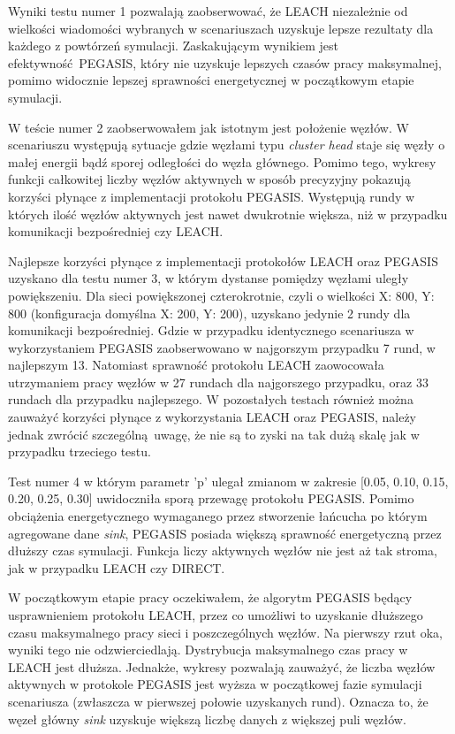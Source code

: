 \documentclass[a4paper,12pt,twoside,openany]{report}
\begin{document}
Wyniki testu numer 1 pozwalają zaobserwować, że LEACH niezależnie od wielkości wiadomości wybranych w scenariuszach uzyskuje lepsze rezultaty dla każdego z powtórzeń symulacji.
Zaskakującym wynikiem jest efektywność PEGASIS, który nie uzyskuje lepszych czasów pracy maksymalnej, pomimo widocznie lepszej sprawności energetycznej w początkowym etapie symulacji.

W teście numer 2 zaobserwowałem jak istotnym jest położenie węzłów. W scenariuszu występują sytuacje gdzie węzłami typu \textit{cluster head} staje się węzły o małej energii bądź sporej odległości do węzła głównego.
Pomimo tego, wykresy funkcji całkowitej liczby węzłów aktywnych w sposób precyzyjny pokazują korzyści płynące z implementacji protokołu PEGASIS. Występują rundy w których ilość węzłów aktywnych jest nawet dwukrotnie większa, niż w przypadku
komunikacji bezpośredniej czy LEACH.

Najlepsze korzyści płynące z implementacji protokołów LEACH oraz PEGASIS uzyskano dla testu numer 3, w którym dystanse pomiędzy węzłami uległy powiększeniu.
Dla sieci powiększonej czterokrotnie, czyli o wielkości X: 800, Y: 800 (konfiguracja domyślna X: 200, Y: 200), uzyskano jedynie 2 rundy dla komunikacji bezpośredniej.
Gdzie w przypadku identycznego scenariusza w wykorzystaniem PEGASIS zaobserwowano w najgorszym przypadku 7 rund, w najlepszym 13. Natomiast sprawność protokołu LEACH zaowocowała utrzymaniem pracy węzłów 
w 27 rundach dla najgorszego przypadku, oraz 33 rundach dla przypadku najlepszego.
W pozostałych testach również można zauważyć korzyści płynące z wykorzystania LEACH oraz PEGASIS, należy jednak zwrócić szczególną uwagę, że nie są to zyski na tak dużą skalę jak w przypadku trzeciego testu.

Test numer 4 w którym parametr 'p' ulegał zmianom w zakresie [0.05, 0.10, 0.15, 0.20, 0.25, 0.30] uwidoczniła sporą przewagę protokołu PEGASIS. Pomimo obciążenia energetycznego wymaganego przez stworzenie łańcucha
po którym agregowane dane \textit{sink}, PEGASIS posiada większą sprawność energetyczną przez dłuższy czas symulacji. Funkcja liczy aktywnych węzłów nie jest aż tak stroma, jak w przypadku LEACH czy DIRECT.

W początkowym etapie pracy oczekiwałem, że algorytm PEGASIS będący usprawnieniem protokołu LEACH, przez co umożliwi to uzyskanie dłuższego czasu maksymalnego pracy sieci i poszczególnych węzłów.
Na pierwszy rzut oka, wyniki tego nie odzwierciedlają. Dystrybucja maksymalnego czas pracy w LEACH jest dłuższa. Jednakże, wykresy pozwalają zauważyć, że liczba węzłów aktywnych
w protokole PEGASIS jest wyższa w początkowej fazie symulacji scenariusza (zwłaszcza w pierwszej połowie uzyskanych rund). Oznacza to, że węzeł główny \textit{sink} uzyskuje większą liczbę danych z większej puli węzłów.
\end{document}

